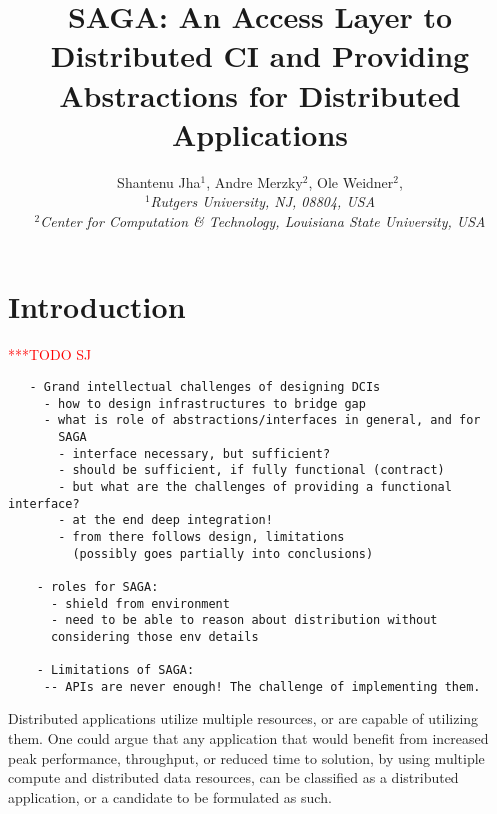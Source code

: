 \documentclass[a4paper,10pt]{article}
\newcommand{\todo}[1]{     {\textcolor{red}  { ***TODO      #1 }}}
\newcommand{\todo}[1]{}
\begin{document}
\title{ \large \vspace{-3.5em} SAGA: An Access Layer to Distributed CI
  and Providing Abstractions for Distributed Applications}


\author{\normalsize Shantenu Jha$^{1}$, Andre Merzky$^{2}$, Ole
  Weidner$^{2}$, \\ \small{\emph{$^{1}$Rutgers University, NJ, 08804,
      USA}}\\ \small{\emph{$^{2}$Center for Computation \& Technology,
      Louisiana State University, USA}}\\ } \date{}
 \maketitle

 
\section{Introduction}\todo{SJ}
 \label{intro}

\begin{verbatim}
   - Grand intellectual challenges of designing DCIs
     - how to design infrastructures to bridge gap
     - what is role of abstractions/interfaces in general, and for
       SAGA
       - interface necessary, but sufficient?
       - should be sufficient, if fully functional (contract)
       - but what are the challenges of providing a functional interface?
       - at the end deep integration!
       - from there follows design, limitations
         (possibly goes partially into conclusions)

    - roles for SAGA: 
      - shield from environment
      - need to be able to reason about distribution without
      considering those env details

    - Limitations of SAGA:
     -- APIs are never enough! The challenge of implementing them. 

\end{verbatim}

Distributed applications utilize multiple resources, or are capable of
utilizing them. One could argue that any application that would
benefit from increased peak performance, throughput, or reduced time
to solution, by using multiple compute and distributed data resources,
can be classified as a distributed application, or a candidate to be
formulated as such.

\end{document}
